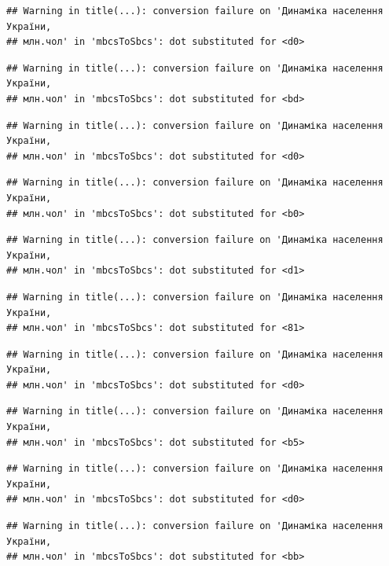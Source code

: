\documentclass[
]{article}
\begin{document}
\begin{verbatim}
## Warning in title(...): conversion failure on 'Динаміка населення України,
## млн.чол' in 'mbcsToSbcs': dot substituted for <d0>
\end{verbatim}

\begin{verbatim}
## Warning in title(...): conversion failure on 'Динаміка населення України,
## млн.чол' in 'mbcsToSbcs': dot substituted for <bd>
\end{verbatim}

\begin{verbatim}
## Warning in title(...): conversion failure on 'Динаміка населення України,
## млн.чол' in 'mbcsToSbcs': dot substituted for <d0>
\end{verbatim}

\begin{verbatim}
## Warning in title(...): conversion failure on 'Динаміка населення України,
## млн.чол' in 'mbcsToSbcs': dot substituted for <b0>
\end{verbatim}

\begin{verbatim}
## Warning in title(...): conversion failure on 'Динаміка населення України,
## млн.чол' in 'mbcsToSbcs': dot substituted for <d1>
\end{verbatim}

\begin{verbatim}
## Warning in title(...): conversion failure on 'Динаміка населення України,
## млн.чол' in 'mbcsToSbcs': dot substituted for <81>
\end{verbatim}

\begin{verbatim}
## Warning in title(...): conversion failure on 'Динаміка населення України,
## млн.чол' in 'mbcsToSbcs': dot substituted for <d0>
\end{verbatim}

\begin{verbatim}
## Warning in title(...): conversion failure on 'Динаміка населення України,
## млн.чол' in 'mbcsToSbcs': dot substituted for <b5>
\end{verbatim}

\begin{verbatim}
## Warning in title(...): conversion failure on 'Динаміка населення України,
## млн.чол' in 'mbcsToSbcs': dot substituted for <d0>
\end{verbatim}

\begin{verbatim}
## Warning in title(...): conversion failure on 'Динаміка населення України,
## млн.чол' in 'mbcsToSbcs': dot substituted for <bb>
\end{verbatim}
\end{document}
